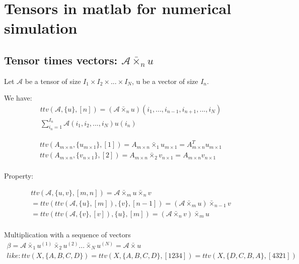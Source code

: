 \documentclass{Note}
\begin{document}
\section{Tensors in matlab for numerical simulation}
\subsection{Tensor times vectors: $\mathcal{A}\bar{\times}_n u$}

Let $\mathcal{A}$ be a tensor of size $I_1\times I_2\times ...\times I_N$, u be a vector of size $I_n$.

We have:
\begin{equation}
\begin{aligned}
ttv(\mathcal{A},\{u\},[n])=(\mathcal{A}\bar{\times}_n u)(i_1,...,i_{n-1},i_{n+1},...,i_N)\\
\sum_{i_n=1}^{I_n}\mathcal{A}(i_1,i_2,...,i_N)u(i_n)
\end{aligned}
\end{equation}

\begin{equation}
\begin{aligned}
ttv(A_{m\times n},\{u_{m\times 1}\},[1])=A_{m\times n}\bar{\times}_1 u_{m\times 1}=A_{m\times n}^T u_{m\times 1}\\
ttv(A_{m\times n},\{v_{n\times 1}\},[2])=A_{m\times n}\bar{\times}_2 v_{n\times 1}=A_{m\times n}  v_{n\times 1}\\
\end{aligned}
\end{equation}

Property:

\begin{equation}
\begin{aligned}
ttv(\mathcal{A},\{u,v\},[m,n])=\mathcal{A}\bar{\times}_m u \bar{\times}_n v\\
=ttv(ttv(\mathcal{A},\{u\},[m]),\{v\},[n-1])=(\mathcal{A}\bar{\times}_m u ) \bar{\times}_{n-1} v\\
=ttv(ttv(\mathcal{A},\{v\},[v]),\{u\},[m])=(\mathcal{A}\bar{\times}_n v ) \bar{\times}_{m} u\\
\end{aligned}
\end{equation}

Multiplication with a sequence of vectors
\begin{equation}
\begin{aligned}
\beta=\mathcal{A}\bar{\times}_1 u^{(1)}\bar{\times}_2 u^{(2)}...\bar{\times}_N u^{(N)}=\mathcal{A}\bar{\times} {u}\\
like:
ttv(X, \{A,B,C,D\})
= ttv(X, \{A,B,C,D\}, [1 2 3 4]) 
= ttv(X, \{D,C,B,A\}, [4 3 2 1])
\end{aligned}
\end{equation}
\end{document}
